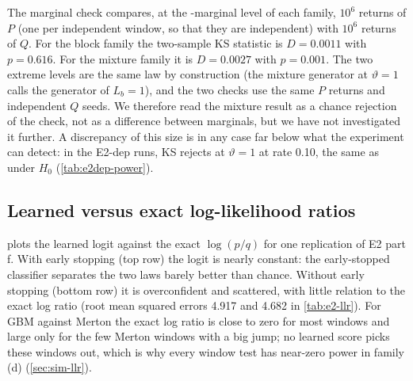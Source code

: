 The marginal check compares, at the \iid{}-marginal level of each family, $10^6$ returns of $P$
(one per independent window, so that they are independent) with $10^6$ returns of $Q$. For the
block family the two-sample KS statistic is $D=0.0011$ with $p=0.616$. For the mixture family it is
$D=0.0027$ with $p=0.001$. The two extreme levels are the same law by construction (the mixture
generator at $\vartheta=1$ calls the generator of $L_b=1$), and the two checks use the same $P$
returns and independent $Q$ seeds. We therefore read the mixture result as a chance rejection of
the check, not as a difference between marginals, but we have not investigated it further. A
discrepancy of this size is in any case far below what the experiment can detect: in the E2-dep
runs, KS rejects at $\vartheta=1$ at rate 0.10, the same as under $H_0$ (\cref{tab:e2dep-power}).

\begin{table}[tbp]
  \centering
  \caption{E2-dep dependence diagnostics and marginal check. Columns 3--5: within-window lag-1
    autocorrelation of $\abs{r-\mu}$, cross-window standard deviation of the log realised
    variance, and return variance, each on 20,000 simulated $Q$ windows of $L=20$ days per level.
    Columns 6--7: two-sample KS test of the marginal at the \iid{}-marginal level, $10^6$ returns
    of $P$ (one per independent window) against $10^6$ returns of $Q$.}
  \label{tab:e2dep-check}
  \small
\end{table}

\subsection{Learned versus exact log-likelihood ratios}\label{app:sim-llr}

 plots the learned logit against the exact $\log(p/q)$ for one replication
of E2 part f. With early stopping (top row) the logit is nearly constant: the early-stopped
classifier separates the two laws barely better than chance. Without early stopping (bottom row)
it is overconfident and scattered, with little relation to the exact log ratio (root mean squared
errors 4.917 and 4.682 in \cref{tab:e2-llr}). For GBM against Merton the exact log ratio is close to zero for most
windows and large only for the few Merton windows with a big jump; no learned score picks these
windows out, which is why every window test has near-zero power in family (d)
(\cref{sec:sim-llr}).

